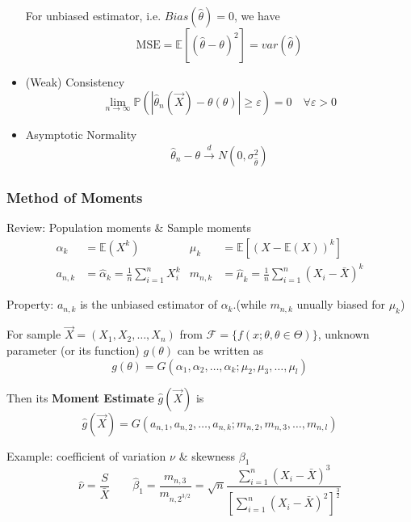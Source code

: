 \begin{itemize}
        For unbiased estimator, i.e. $Bias(\hat{\theta})=0$, we have
        \begin{equation}
            \text{MSE}=\mathbb{E}[(\hat{\theta}-\theta)^2]=var(\hat{\theta})
        \end{equation}
        \item (Weak) Consistency
        \begin{equation}
            \lim_{n\to\infty}\mathbb{P}(|\hat{\theta }_n(\vec{X})-\theta (\theta)|\geq \varepsilon)=0\quad\forall\varepsilon>0    
        \end{equation}
        \item Asymptotic Normality
        \begin{align*}
            \hat{\theta }_n-\theta \xrightarrow[]{d} N(0,\sigma ^2_{\hat{\theta }}) 
        \end{align*}
        
        
    \end{itemize}


\subsubsection{Method of Moments}\label{SubSectionMoM}
    Review: Population moments \& Sample moments
    \begin{align*}
        \alpha_k&=\mathbb{E}(X^k)&\mu_k&=\mathbb{E}[(X-\mathbb{E}(X))^k]\\
        a_{n,k}&=\hat{\alpha }_k =\frac{1}{n}\sum_{i=1}^nX_i^k&m_{n,k}&=\hat{\mu }_k=\frac{1}{n}\sum_{i=1}^n(X_i-\bar{X})^k
    \end{align*}

    Property: $a_{n,k}$ is the unbiased estimator of $\alpha_k$.(while $m_{n,k}$ unually biased for $\mu_k$)

    For sample $\vec{X}=(X_1,X_2,\ldots,X_n)$ from $\mathscr{F}=\{f(x;\theta,\theta\in\Theta)\}$, unknown parameter (or its function) $g(\theta)$ can be written as
    \begin{equation}
        g(\theta)=G(\alpha_1,\alpha_2,\ldots,\alpha_k;\mu_2,\mu_3,\ldots,\mu_l)    
    \end{equation}

    Then its \textbf{Moment Estimate} $\hat{g}(\vec{X})$ is
\begin{equation}
    \hat{g}(\vec{X})=G(a_{n,1},a_{n,2},\ldots,a_{n,k};m_{n,2},m_{n,3},\ldots,m_{n,l}) 
\end{equation}

    Example: coefficient of variation $ \nu $ \& skewness $ \beta _1 $
    \begin{equation}\hat{\nu}=\dfrac{S}{\bar{X}}\qquad\hat{\beta}_1=\dfrac{m_{n,3}}{m_{n,2^{3/2}}}=\sqrt{n}{\displaystyle\frac{\displaystyle{\sum_{i=1}^n(X_i-\bar{X})^3}}{\displaystyle{\left[\sum_{i=1}^n(X_i-\bar{X})^2\right]^{\frac{3}{2}}}  }}\end{equation}

